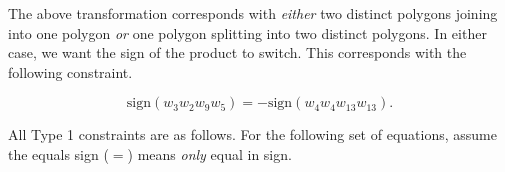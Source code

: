 \documentclass[12pt]{article}
\theoremstyle{plain}
\theoremstyle{definition}
\theoremstyle{remark}
\theoremstyle{definition}
\newcommand{\cell}[4]{ \draw[thick] ( #1 , #2 ) rectangle ( #3 , #4 );}
\newcommand{\lablnode}[3]{\node[shape=circle,draw=none,fill=none, inner sep=0pt,minimum size=5pt] (A) at ( #1 , #2 ) {#3};}
\newcommand{\lablvertex}[3]{\node[shape=circle,draw=none,fill=white, inner sep=2pt,minimum size=5pt] (A) at ( #1 , #2 ) {#3};}
\begin{document}
\begin{center}
\end{center}

The above transformation corresponds with \textit{either} two distinct polygons joining into one polygon \textit{or} one polygon splitting into two distinct polygons. In either case, we want the sign of the product to switch. This corresponds with the following constraint.

$$\text{sign}(w_{3}w_{2}w_{9}w_{5}) = -\text{sign}(w_{4}w_{4}w_{13}w_{13}).$$

All Type 1 constraints are as follows. For the following set of equations, assume the equals sign ($=$) means \textit{only} equal in sign.
\end{document}

